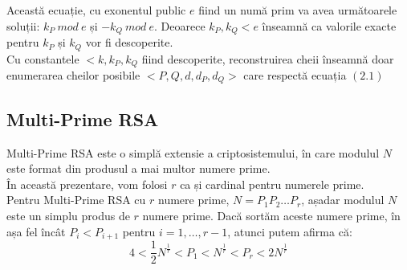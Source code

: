 \documentclass[12]{report}
\begin{document}
Această ecuație, cu exonentul public $e$ fiind un numă prim va avea următoarele soluții: $k_P \ mod \ e$ și $-k_Q \ mod \ e$. Deoarece $k_P,k_Q <e$ înseamnă ca valorile exacte pentru $k_P$ și $k_Q$ vor fi descoperite. \\
Cu constantele $<k,k_P,k_Q$ fiind descoperite, reconstruirea cheii înseamnă doar enumerarea cheilor posibile $<P,Q,d,d_P,d_Q>$ care respectă ecuația $(2.1)$


\subsection{Multi-Prime RSA}
Multi-Prime RSA este o simplă extensie a criptosistemului, în care modulul $N$ este format din produsul a mai multor numere prime. \\
În această prezentare, vom folosi $r$ ca și cardinal pentru numerele prime.\\
Pentru Multi-Prime RSA cu $r$ numere prime, $N=P_1 P_2 \dots P_r$, așadar modulul $N$ este un simplu produs de $r$ numere prime. Dacă sortăm aceste numere prime, în așa fel încât $P_i < P_{i+1}$ pentru $i=1, \dots, r-1$, atunci putem afirma că:
\begin{equation}
4<\frac{1}{2}N^{\frac{1}{r}}<P_1<N^{\frac{1}{r}}<P_r <2N^{\frac{1}{r}}
\end{equation}
\end{document}
